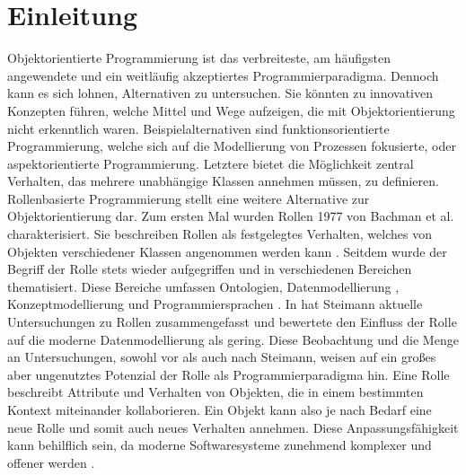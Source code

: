\documentclass[conference]{IEEEtran}
\begin{document}
\section{Einleitung}
Objektorientierte Programmierung ist das verbreiteste, am häufigsten angewendete und ein weitläufig akzeptiertes Programmierparadigma. Dennoch kann es sich lohnen, Alternativen zu untersuchen. Sie könnten zu innovativen Konzepten führen, welche Mittel und Wege aufzeigen, die mit Objektorientierung nicht erkenntlich waren. Beispielalternativen sind funktionsorientierte Programmierung, welche sich auf die Modellierung von Prozessen fokusierte, oder aspektorientierte Programmierung. Letztere bietet die Möglichkeit zentral Verhalten, das mehrere unabhängige Klassen annehmen müssen, zu definieren. \\ Rollenbasierte Programmierung stellt eine weitere Alternative zur Objektorientierung dar. Zum ersten Mal wurden Rollen 1977 von Bachman et al. charakterisiert. Sie beschreiben Rollen als festgelegtes Verhalten, welches von Objekten verschiedener Klassen angenommen werden kann \cite{bachman}. Seitdem wurde der Begriff der Rolle stets wieder aufgegriffen und in verschiedenen Bereichen thematisiert. Diese Bereiche umfassen Ontologien\cite{loebe2005abstract}\cite{guarino2009overview}, Datenmodellierung \cite{halpin2005orm}, Konzeptmodellierung \cite{hennicker2015model} und Programmiersprachen \cite{ubayashi2000roleep}. In \cite{steimann2000representation} hat Steimann aktuelle Untersuchungen zu Rollen zusammengefasst und bewertete den Einfluss der Rolle auf die moderne Datenmodellierung als gering. Diese Beobachtung und die Menge an Untersuchungen, sowohl vor als auch nach Steimann, weisen auf ein großes aber ungenutztes Potenzial der Rolle als Programmierparadigma hin. Eine Rolle beschreibt Attribute und Verhalten von Objekten, die in einem bestimmten Kontext miteinander kollaborieren. Ein Objekt kann also je nach Bedarf eine neue Rolle und somit auch neues Verhalten annehmen. Diese Anpassungsfähigkeit kann behilflich sein, da moderne Softwaresysteme zunehmend komplexer und offener werden \cite{murer2008managed}. \\
\end{document}
